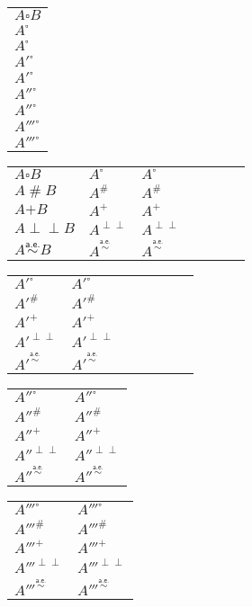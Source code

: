 \documentclass{standalone}
\newcommand\mesh{\mathrel{\#}}
\newcommand\smallplus{\mathbin{\texttt{+}}}
\newcommand\indep{\mathrel{\perp\!\!\!\perp}}
\newcommand\myrel{\mathrel{\overset{\textsf{a.e.}}{\sim}}}
\begin{document}
\begin{tabular}{l}
	$A \square B$   \\
	$A^\square$     \\
	$A^{\square}$   \\
	$A'^\square$    \\
	$A'^{\square}$  \\
	$A''^\square$   \\
	$A''^{\square}$ \\
	$A'''^\square$   \\
	$A'''^{\square}$ \\
\end{tabular}
\begin{tabular}{lllllll}
$A \square B   $ &  $A^\square   $ & $A^{\square}   $ \\
$A \mesh B     $ &  $A^\mesh     $ & $A^{\mesh}     $ \\
$A \smallplus B$ &  $A^\smallplus$ & $A^{\smallplus}$ \\
$A \indep B    $ &  $A^\indep    $ & $A^{\indep}    $ \\
$A \myrel B    $ &  $A^\myrel    $ & $A^{\myrel}    $ \\
\end{tabular}

\begin{tabular}{lllllll}
$A'^\square   $ & $A'^{\square}   $ \\
$A'^\mesh     $ & $A'^{\mesh}     $ \\
$A'^\smallplus$ & $A'^{\smallplus}$ \\
$A'^\indep    $ & $A'^{\indep}    $ \\
$A'^\myrel    $ & $A'^{\myrel}    $ \\
\end{tabular}

\begin{tabular}{ll}
$A''^\square   $ & $A''^{\square}   $ \\
$A''^\mesh     $ & $A''^{\mesh}     $ \\
$A''^\smallplus$ & $A''^{\smallplus}$ \\
$A''^\indep    $ & $A''^{\indep}    $ \\
$A''^\myrel    $ & $A''^{\myrel}    $ \\
\end{tabular}

\begin{tabular}{ll}
$A'''^\square   $ & $A'''^{\square}   $ \\
$A'''^\mesh     $ & $A'''^{\mesh}     $ \\
$A'''^\smallplus$ & $A'''^{\smallplus}$ \\
$A'''^\indep    $ & $A'''^{\indep}    $ \\
$A'''^\myrel    $ & $A'''^{\myrel}    $ \\
\end{tabular}
\end{document}
